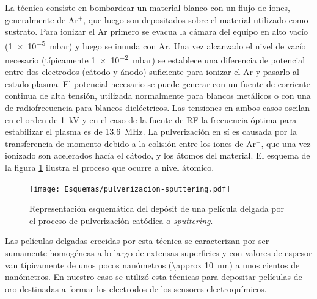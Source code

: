 		La técnica consiste en bombardear un material blanco con un flujo de iones, generalmente de Ar$^+$, que luego son depositados sobre el material utilizado como sustrato. Para ionizar el Ar primero se evacua la cámara del equipo en alto vacío (\SI{1e-5}{\milli\bar}) y luego se inunda con Ar. Una vez alcanzado el nivel de vacío necesario (típicamente \SI{1e-2}{\milli\bar}) se establece una diferencia de potencial entre dos electrodos (cátodo y ánodo) suficiente para ionizar el Ar y pasarlo al estado plasma. El potencial necesario se puede generar con un fuente de corriente continua de alta tensión, utilizada normalmente para blancos metálicos o con una de radiofrecuencia para blancos dieléctricos. Las tensiones en ambos casos oscilan en el orden de \SI{1}{\kilo\volt} y en el caso de la fuente de RF la frecuencia óptima para estabilizar el plasma es de \SI{13.6}{\mega\hertz}. La pulverización en sí es causada por la transferencia de momento debido a la colisión entre los iones de Ar$^+$, que una vez ionizado son acelerados hacía el cátodo, y los átomos del material. El esquema de la figura \ref{fig:sssspputt} ilustra el proceso que ocurre a nivel átomico. \cite{Behrisch1981,sigmund1968,Bhatt2007}

			\begin{figure}[th!]
 				\begin{center}
 				\texttt{[image: Esquemas/pulverizacion-sputtering.pdf]}
 				\caption[Etapas del proceso de pulverización catódica]{Representación esquemática del depósit de una película delgada por el proceso de pulverización catódica o \textit{sputtering}.}
 		   		\label{fig:sssspputt}
 		    	\end{center}
 		    	\end{figure}

		Las películas delgadas crecidas por esta técnica se caracterizan por ser sumamente homogéneas a lo largo de extensas superficies y con valores de espesor van típicamente de unos pocos nanómetros (\SI{\approx 10}{\nm}) a unos cientos de nanómetros. En nuestro caso se utilizó esta técnicas para depositar películas de oro destinadas a formar los electrodos de los sensores electroquímicos.

